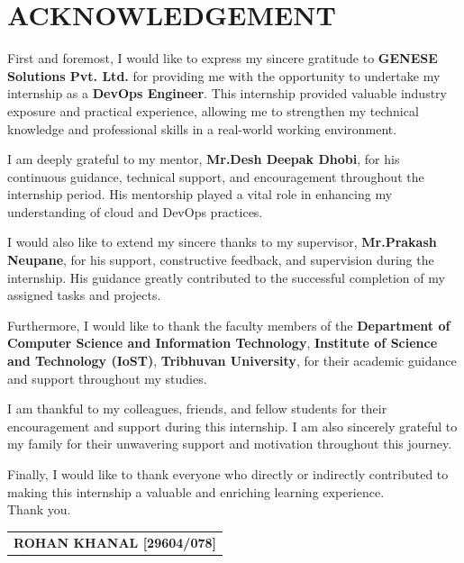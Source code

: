 
\section*{\Large\centering \textbf{ACKNOWLEDGEMENT}}
First and foremost, I would like to express my sincere gratitude to \textbf{GENESE Solutions Pvt. Ltd.} for providing me with the opportunity to undertake my internship as a \textbf{DevOps Engineer}. This internship provided valuable industry exposure and practical experience, allowing me to strengthen my technical knowledge and professional skills in a real-world working environment.

I am deeply grateful to my mentor, \textbf{Mr.\@ Desh Deepak Dhobi}, for his continuous guidance, technical support, and encouragement throughout the internship period. His mentorship played a vital role in enhancing my understanding of cloud and DevOps practices.

I would also like to extend my sincere thanks to my supervisor, \textbf{Mr.\@ Prakash Neupane}, for his support, constructive feedback, and supervision during the internship. His guidance greatly contributed to the successful completion of my assigned tasks and projects.

Furthermore, I would like to thank the faculty members of the \textbf{Department of Computer Science and Information Technology}, \textbf{Institute of Science and Technology (IoST)}, \textbf{Tribhuvan University}, for their academic guidance and support throughout my studies.

I am thankful to my colleagues, friends, and fellow students for their encouragement and support during this internship. I am also sincerely grateful to my family for their unwavering support and motivation throughout this journey.

Finally, I would like to thank everyone who directly or indirectly contributed to making this internship a valuable and enriching learning experience.\\[0.5em]
Thank you.

\begin{flushright}
    \begin{tabular}{l}
        \textbf{ROHAN KHANAL [29604/078]}     \\       
    \end{tabular}
\end{flushright}

\newpage